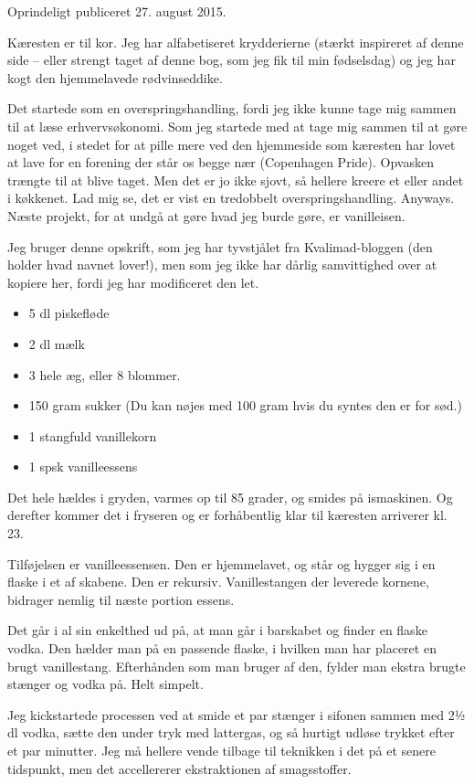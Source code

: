 \documentclass[
  letterpaper,
  DIV=11,
  numbers=noendperiod]{scrreprt}
\providecommand{\tightlist}{%
  \setlength{\itemsep}{0pt}\setlength{\parskip}{0pt}}\usepackage{longtable,booktabs,array}
\begin{document}
Oprindeligt publiceret 27. august 2015.

Kæresten er til kor. Jeg har alfabetiseret krydderierne (stærkt
inspireret af denne side -- eller strengt taget af denne bog, som jeg
fik til min fødselsdag) og jeg har kogt den hjemmelavede rødvinseddike.

Det startede som en overspringshandling, fordi jeg ikke kunne tage mig
sammen til at læse erhvervsøkonomi. Som jeg startede med at tage mig
sammen til at gøre noget ved, i stedet for at pille mere ved den
hjemmeside som kæresten har lovet at lave for en forening der står os
begge nær (Copenhagen Pride). Opvasken trængte til at blive taget. Men
det er jo ikke sjovt, så hellere kreere et eller andet i køkkenet. Lad
mig se, det er vist en tredobbelt overspringshandling. Anyways. Næste
projekt, for at undgå at gøre hvad jeg burde gøre, er vanilleisen.~

Jeg bruger denne opskrift, som jeg har tyvstjålet fra Kvalimad-bloggen
(den holder hvad navnet lover!), men som jeg ikke har dårlig
samvittighed over at kopiere her, fordi jeg har modificeret den let.

\begin{itemize}
\tightlist
\item
  5 dl piskefløde
\item
  2 dl mælk
\item
  3 hele æg, eller 8 blommer.
\item
  150 gram sukker (Du kan nøjes med 100 gram hvis du syntes den er for
  sød.)
\item
  1 stangfuld vanillekorn
\item
  1 spsk vanilleessens
\end{itemize}

Det hele hældes i gryden, varmes op til 85 grader, og smides på
ismaskinen. Og derefter kommer det i fryseren og er forhåbentlig klar
til kæresten arriverer kl. 23.~

Tilføjelsen er vanilleessensen. Den er hjemmelavet, og står og hygger
sig i en flaske i et af skabene. Den er rekursiv. Vanillestangen der
leverede kornene, bidrager nemlig til næste portion essens.

Det går i al sin enkelthed ud på, at man går i barskabet og finder en
flaske vodka. Den hælder man på en passende flaske, i hvilken man har
placeret en brugt vanillestang. Efterhånden som man bruger af den,
fylder man ekstra brugte stænger og vodka på. Helt simpelt.

Jeg kickstartede processen ved at smide et par stænger i sifonen sammen
med 2½ dl vodka, sætte den under tryk med lattergas, og så hurtigt
udløse trykket efter et par minutter. Jeg må hellere vende tilbage til
teknikken i det på et senere tidspunkt, men det accellererer
ekstraktionen af smagsstoffer.
\end{document}
